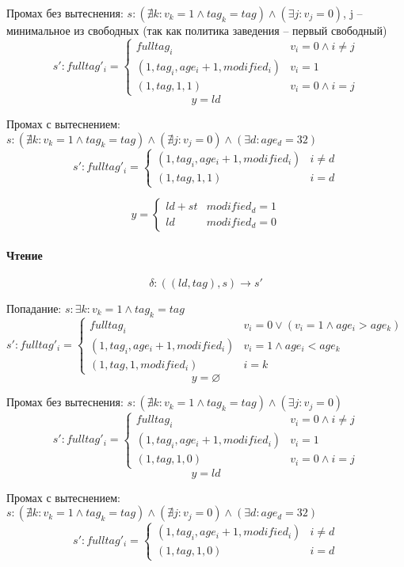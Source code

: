 Промах без вытеснения: $s: (\nexists k : v_k = 1 \land tag_k = tag) \land (\exists j: v_j = 0)$, j -- минимальное из свободных (так как политика заведения -- первый свободный)
\[
s':fulltag'_i =
\begin{cases}
	fulltag_i & v_i = 0 \land i \neq j \\
	(1,tag_i,age_{i}+1,modified_i) & v_i = 1  \\
	(1,tag,1,1) & v_i = 0 \land i = j
\end{cases}
\]
$$y = ld$$

Промах с вытеснением: $s: (\nexists k : v_k = 1 \land tag_k = tag) \land (\nexists j: v_j = 0) \land (\exists d: age_d = 32)$
\[
s':fulltag'_i =
\begin{cases}
	(1,tag_i,age_{i}+1,modified_i) & i \neq d \\
	(1,tag,1,1) & i = d
\end{cases}
\]

\[
y =
\begin{cases}
	ld+st & modified_d = 1 \\
	ld & modified_d = 0
\end{cases}
\]

\paragraph*{Чтение}

$$\delta : ((ld,tag),s) \rightarrow s'$$

Попадание: $s: \exists k : v_k = 1 \land tag_k = tag$
\[
s':fulltag'_i =
\begin{cases}
	fulltag_i & v_i = 0 \lor (v_i = 1 \land age_i > age_k)\\
	(1,tag_i,age_{i}+1,modified_i) & v_i = 1 \land age_i < age_k \\
	(1,tag,1,modified_i) & i = k
\end{cases}
\]
$$y = \varnothing$$

Промах без вытеснения: $s: (\nexists k : v_k = 1 \land tag_k = tag) \land (\exists j: v_j = 0)$
\[
s':fulltag'_i =
\begin{cases}
	fulltag_i & v_i = 0 \land i \neq j \\
	(1,tag_i,age_{i}+1,modified_i) & v_i = 1 \\
	(1,tag,1,0) & v_i = 0 \land i = j
\end{cases}
\]
$$y = ld$$

Промах с вытеснением: $s: (\nexists k : v_k = 1 \land tag_k = tag) \land (\nexists j: v_j = 0) \land (\exists d: age_d = 32)$
\[
s':fulltag'_i =
\begin{cases}
	(1,tag_i,age_{i}+1,modified_i) & i \neq d \\
	(1,tag,1,0) & i = d
\end{cases}
\]

